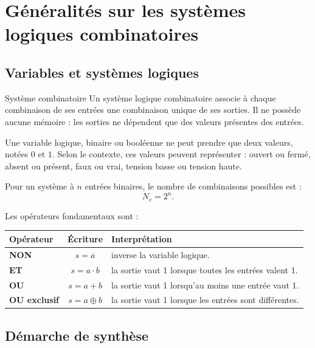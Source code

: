 \section{Généralités sur les systèmes logiques combinatoires}
\label{sec:logique-combinatoire}

\subsection{Variables et systèmes logiques}

\begin{TLLogicDefinition}{Système combinatoire}
Un système logique combinatoire associe à chaque combinaison de ses entrées une combinaison unique de ses sorties. Il ne possède aucune mémoire : les sorties ne dépendent que des valeurs présentes des entrées.
\end{TLLogicDefinition}

Une variable logique, binaire ou booléenne ne peut prendre que deux valeurs, notées $0$ et $1$. Selon le contexte, ces valeurs peuvent représenter : ouvert ou fermé, absent ou présent, faux ou vrai, tension basse ou tension haute.

Pour un système à $n$ entrées binaires, le nombre de combinaisons possibles est :
\[
\boxed{N_c=2^n.}
\]


Les opérateurs fondamentaux sont :
\begin{center}\TLPortesLogiques\end{center}

\begin{center}
\small
\begin{tabularx}{\linewidth}{>{\bfseries}l c X}
\toprule
Opérateur & Écriture & Interprétation \\
\midrule
NON & $s=\overline a$ & inverse la variable logique.\\
ET & $s=a\cdot b$ & la sortie vaut 1 lorsque toutes les entrées valent 1.\\
OU & $s=a+b$ & la sortie vaut 1 lorsqu'au moins une entrée vaut 1.\\
OU exclusif & $s=a\oplus b$ & la sortie vaut 1 lorsque les entrées sont différentes.\\
\bottomrule
\end{tabularx}
\end{center}

\subsection{Démarche de synthèse}

